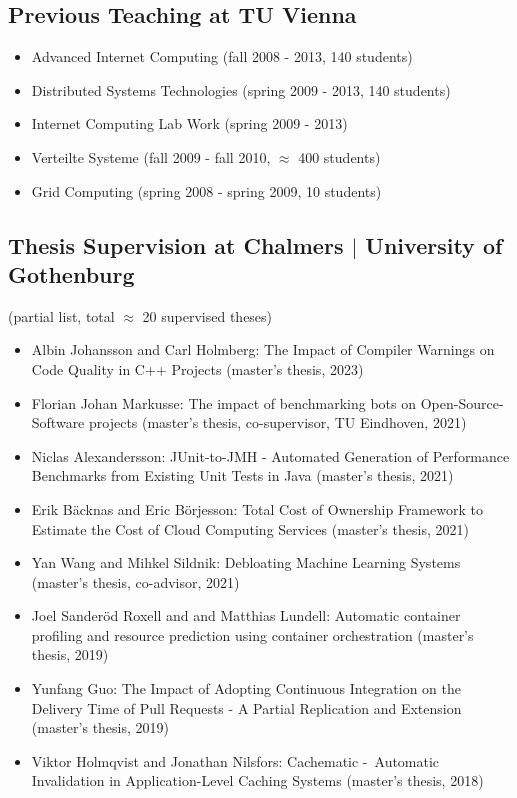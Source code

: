 \documentclass[paper=letter,fontsize=11pt]{scrartcl} %
\begin{document}
\subsection*{Previous Teaching at TU Vienna}
\begin{itemize}
  \item Advanced Internet Computing (fall 2008 - 2013, 140 students)
  \item Distributed Systems Technologies (spring 2009 - 2013, 140 students)
  \item Internet Computing Lab Work (spring 2009 - 2013)
  \item Verteilte Systeme (fall 2009 - fall 2010, $\approx$ 400 students)
  \item Grid Computing (spring 2008 - spring 2009, 10 students)
\end{itemize}

\subsection*{Thesis Supervision at Chalmers $|$ University of Gothenburg}

(partial list, total $\approx$ 20 supervised theses)

\begin{itemize}
  \item Albin Johansson and Carl Holmberg: The Impact of Compiler Warnings on Code Quality in C++ Projects (master's thesis, 2023)
  \item Florian Johan Markusse: The impact of benchmarking bots on Open-Source-Software projects (master's thesis, co-supervisor, TU Eindhoven, 2021)
  \item Niclas Alexandersson: JUnit-to-JMH - Automated Generation of Performance Benchmarks from Existing Unit Tests in Java (master's thesis, 2021)
  \item Erik Bäcknas and  Eric Börjesson: Total Cost of Ownership Framework to Estimate the Cost of Cloud Computing Services (master's thesis, 2021)  
  \item Yan Wang and Mihkel Sildnik: Debloating Machine Learning Systems (master's thesis, co-advisor, 2021)
	\item Joel Sanderöd Roxell and and Matthias Lundell: Automatic container profiling
and resource prediction using container orchestration (master's thesis, 2019)
	\item Yunfang Guo: The Impact of Adopting Continuous Integration on the Delivery Time of Pull Requests - A Partial Replication and Extension (master's thesis, 2019)
  \item Viktor Holmqvist and Jonathan Nilsfors: Cachematic - Automatic Invalidation in Application-Level Caching Systems (master's thesis, 2018)
\end{itemize}
\end{document}
